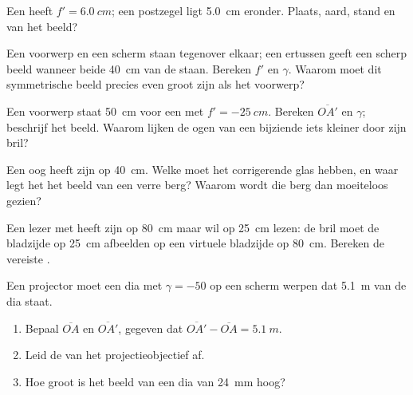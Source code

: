 \begin{exercise}[$\star\star$]\label{exo:g11:lenses-and-eye:7}
Een  heeft $f' = \qty{6.0}{cm}$; een postzegel ligt \qty{5.0}{cm}
eronder. Plaats, aard, stand en  van het beeld?
\end{exercise}

\begin{exercise}[$\star\star$]\label{exo:g11:lenses-and-eye:8}
Een voorwerp en een scherm staan tegenover elkaar; een 
ertussen geeft een scherp beeld wanneer beide \qty{40}{cm} van de 
staan. Bereken $f'$ en $\gamma$. Waarom moet dit symmetrische beeld
precies even groot zijn als het voorwerp?
\end{exercise}

\begin{exercise}[$\star\star$]\label{exo:g11:lenses-and-eye:9}
Een voorwerp staat \qty{50}{cm} voor een  met
$f' = \qty{-25}{cm}$. Bereken $\overline{OA'}$ en $\gamma$; beschrijf het
beeld. Waarom lijken de ogen van een bijziende iets kleiner door zijn
bril?
\end{exercise}

\begin{exercise}[$\star\star$]\label{exo:g11:lenses-and-eye:10}
Een  oog heeft zijn  op \qty{40}{cm}. Welke 
moet het corrigerende glas hebben, en waar legt het het beeld van een
verre berg? Waarom wordt die berg dan moeiteloos gezien?
\end{exercise}

\begin{exercise}[$\star\star$]\label{exo:g11:lenses-and-eye:11}
Een lezer met  heeft zijn  op \qty{80}{cm}
maar wil op \qty{25}{cm} lezen: de bril moet de bladzijde op \qty{25}{cm}
afbeelden op een virtuele bladzijde op \qty{80}{cm}. Bereken de vereiste
.
\end{exercise}

\begin{exercise}[$\star\star\star$]\label{exo:g11:lenses-and-eye:12}
Een projector moet een dia met  $\gamma = -50$ op een scherm
werpen dat \qty{5.1}{m} van de dia staat.
\begin{enumerate}
  \item Bepaal $\overline{OA}$ en $\overline{OA'}$, gegeven dat
        $\overline{OA'} - \overline{OA} = \qty{5.1}{m}$.
  \item Leid de  van het projectieobjectief af.
  \item Hoe groot is het beeld van een dia van \qty{24}{mm} hoog?
\end{enumerate}
\end{exercise}

